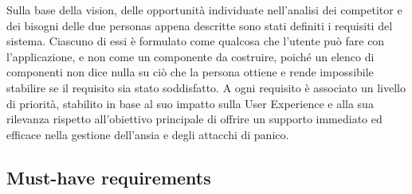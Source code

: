 Sulla base della vision, delle opportunità individuate nell'analisi dei competitor e dei bisogni delle due personas appena descritte sono stati definiti i requisiti del sistema.
Ciascuno di essi è formulato come qualcosa che l'utente può fare con l'applicazione, e non come un componente da costruire, poiché un elenco di componenti non dice nulla su ciò che la persona ottiene e rende impossibile stabilire se il requisito sia stato soddisfatto.
A ogni requisito è associato un livello di priorità, stabilito in base al suo impatto sulla User Experience e alla sua rilevanza rispetto all'obiettivo principale di offrire un supporto immediato ed efficace nella gestione dell'ansia e degli attacchi di panico.

\subsection{Must-have requirements}
\label{subsec:must-have}

